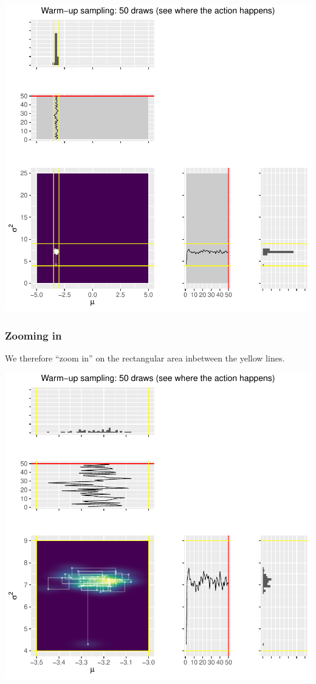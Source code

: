 \documentclass[
  11pt,
]{article}
\begin{document}
\begin{center}\includegraphics{01-02-lec_files/figure-latex/warmup-find-1} \end{center}

\hypertarget{zooming-in}{%
\subsubsection{Zooming in}\label{zooming-in}}

We therefore ``zoom in'' on the rectangular area inbetween the yellow
lines.

\begin{center}\includegraphics{01-02-lec_files/figure-latex/warmup-find-zoom-1} \end{center}
\end{document}
